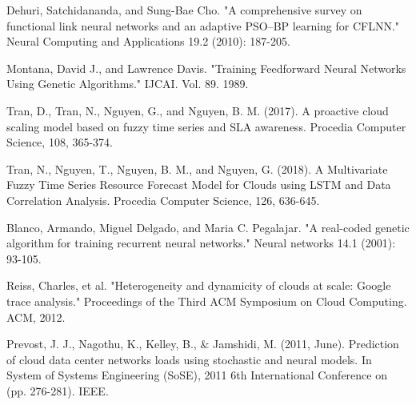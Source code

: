 \documentclass[conference]{IEEEtran}
\begin{document}
\begin{thebibliography}{00}
Dehuri, Satchidananda, and Sung-Bae Cho. "A comprehensive survey on functional link neural networks and an adaptive PSO–BP learning for CFLNN." Neural Computing and Applications 19.2 (2010): 187-205.

Montana, David J., and Lawrence Davis. "Training Feedforward Neural Networks Using Genetic Algorithms." IJCAI. Vol. 89. 1989.

Tran, D., Tran, N., Nguyen, G., and Nguyen, B. M. (2017). A proactive cloud scaling model based on fuzzy time series and SLA awareness. Procedia Computer Science, 108, 365-374.

Tran, N., Nguyen, T., Nguyen, B. M., and Nguyen, G. (2018). A Multivariate Fuzzy Time Series Resource Forecast Model for Clouds using LSTM and Data Correlation Analysis. Procedia Computer Science, 126, 636-645.

Blanco, Armando, Miguel Delgado, and Maria C. Pegalajar. "A real-coded genetic algorithm for training recurrent neural networks." Neural networks 14.1 (2001): 93-105.

Reiss, Charles, et al. "Heterogeneity and dynamicity of clouds at scale: Google trace analysis." Proceedings of the Third ACM Symposium on Cloud Computing. ACM, 2012.

Prevost, J. J., Nagothu, K., Kelley, B., $\&$ Jamshidi, M. (2011, June). Prediction of cloud data center networks loads using stochastic and neural models. In System of Systems Engineering (SoSE), 2011 6th International Conference on (pp. 276-281). IEEE.

\end{thebibliography}
\end{document}
